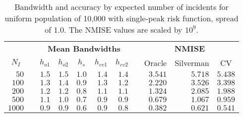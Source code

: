 \begin{table}[htbp]
\begin{center}
\begin{tabular}{rcrrrrrcrrr}
\hline\hline
\multicolumn{1}{c}{\bfseries }&\multicolumn{1}{c}{\bfseries }&\multicolumn{5}{c}{\bfseries Mean Bandwidths}&\multicolumn{1}{c}{\bfseries }&\multicolumn{3}{c}{\bfseries NMISE}\tabularnewline
\cline{3-7} \cline{9-11}
\multicolumn{1}{c}{$N_I$}&\multicolumn{1}{c}{}&\multicolumn{1}{c}{$h_{o1}$}&\multicolumn{1}{c}{$h_{o2}$}&\multicolumn{1}{c}{$h_{s}$}&\multicolumn{1}{c}{$h_{cv1}$}&\multicolumn{1}{c}{$h_{cv2}$}&\multicolumn{1}{c}{}&\multicolumn{1}{c}{Oracle}&\multicolumn{1}{c}{Silverman}&\multicolumn{1}{c}{CV}\tabularnewline
\hline
$  50$&&$1.5$&$1.5$&$1.0$&$1.4$&$1.4$&&$3.541$&$5.718$&$5.438$\tabularnewline
$ 100$&&$1.3$&$1.4$&$0.9$&$1.3$&$1.2$&&$2.220$&$3.526$&$3.398$\tabularnewline
$ 200$&&$1.2$&$1.2$&$0.8$&$1.1$&$1.1$&&$1.324$&$2.085$&$1.988$\tabularnewline
$ 500$&&$1.1$&$1.0$&$0.7$&$0.9$&$0.9$&&$0.679$&$1.067$&$0.959$\tabularnewline
$1000$&&$0.9$&$0.9$&$0.6$&$0.9$&$0.8$&&$0.382$&$0.621$&$0.541$\tabularnewline
\hline
\end{tabular}
\caption[Bandwidth and accuracy by expected number of incidents]{Bandwidth and accuracy by expected number of incidents for uniform population of 10,000 with single-peak risk function, spread of 1.0. The NMISE values are scaled by $10^9$.\label{tab:results:bandwidth_vs_mu}}\end{center}
\end{table}
